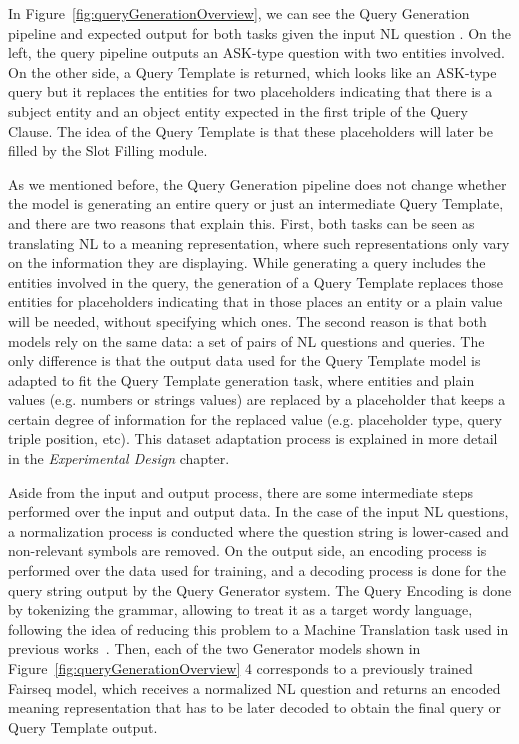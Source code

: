 In Figure~\ref{fig:queryGenerationOverview}, we can see the Query Generation pipeline and 
expected output for both tasks given the input NL question . On the left, the \SPARQL{} query pipeline outputs an ASK-type \SPARQL{} question with two 
entities involved. On the other side, a Query Template is returned, which looks like an 
ASK-type \SPARQL{} query but it replaces the entities for two placeholders indicating that there 
is a subject entity and an object entity expected in the first triple of the Query Clause. 
The idea of the Query Template is that these placeholders will later be filled by the Slot 
Filling module.

As we mentioned before, the Query Generation pipeline does not change whether the model is 
generating an entire \SPARQL{} query or just an intermediate Query Template, and there are two 
reasons that explain this. First, both tasks can be seen as translating NL to a meaning 
representation, where such representations only vary on the information they are displaying. 
While generating a \SPARQL{} query includes the entities involved in the query, the generation 
of a Query Template replaces those entities for placeholders indicating that in those places 
an entity or a plain value will be needed, without specifying which ones. The second reason 
is that both models rely on the same data: a set of pairs of NL questions and \SPARQL{} queries. 
The only difference is that the output data used for the Query Template model is adapted to 
fit the Query Template generation task, where entities and plain values (e.g. numbers or 
strings values) are replaced by a placeholder that keeps a certain degree of information for 
the replaced value (e.g. placeholder type, query triple position, etc). This dataset 
adaptation process is explained in more detail in the \textit{Experimental Design} chapter.

Aside from the input and output process, there are some intermediate steps performed over the 
input and output data. In the case of the input NL questions, a normalization process is 
conducted where the question string is lower-cased and non-relevant symbols are removed. On 
the output side, an encoding process is performed over the data used for training, and a 
decoding process is done for the query string output by the Query Generator system. The Query 
Encoding is done by tokenizing the \SPARQL{} grammar, allowing to treat it as a target wordy 
language, following the idea of reducing this problem to a Machine Translation task used in 
previous works~\cite{semPar:ChoMGBBSB14, semPar:sempar-as-mt-AndreasVC13, nmt:nl-to-sparql-Yin19}. 
Then, each of the two Generator models shown in Figure~\ref{fig:queryGenerationOverview} 4 
corresponds to a previously trained Fairseq model, which receives a normalized NL question 
and returns an encoded meaning representation that has to be later decoded to obtain the 
final \SPARQL{} query or Query Template output.


